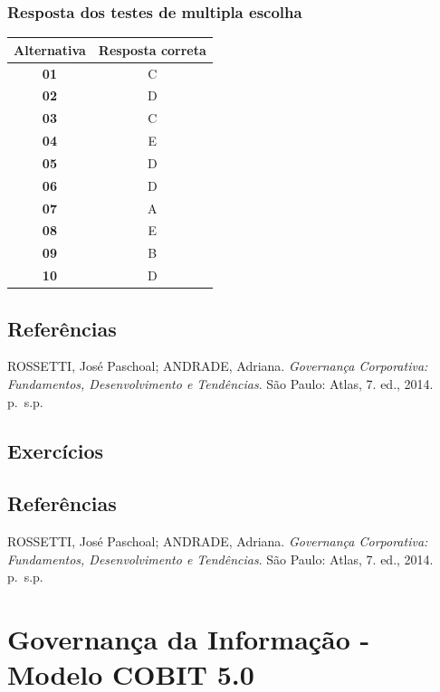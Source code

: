 \documentclass[
]{book}
\begin{document}
\subsection{Resposta dos testes de multipla escolha}\label{resposta-dos-testes-de-multipla-escolha}

\begin{longtable}[]{@{}cc@{}}
\toprule\noalign{}
Alternativa & Resposta correta \\
\midrule\noalign{}
\endhead
\bottomrule\noalign{}
\endlastfoot
\textbf{01} & C \\
\textbf{02} & D \\
\textbf{03} & C \\
\textbf{04} & E \\
\textbf{05} & D \\
\textbf{06} & D \\
\textbf{07} & A \\
\textbf{08} & E \\
\textbf{09} & B \\
\textbf{10} & D \\
\end{longtable}

\section{Referências}\label{referuxeancias-4}

ROSSETTI, José Paschoal; ANDRADE, Adriana. \emph{Governança Corporativa: Fundamentos, Desenvolvimento e Tendências}. São Paulo: Atlas, 7. ed., 2014. p.~s.p.

\section{Exercícios}\label{exercuxedcios-4}

\section{Referências}\label{referuxeancias-5}

ROSSETTI, José Paschoal; ANDRADE, Adriana. \emph{Governança Corporativa: Fundamentos, Desenvolvimento e Tendências}. São Paulo: Atlas, 7. ed., 2014. p.~s.p.

\chapter{Governança da Informação - Modelo COBIT 5.0}\label{governanuxe7a-da-informauxe7uxe3o---modelo-cobit-5.0}
\end{document}

